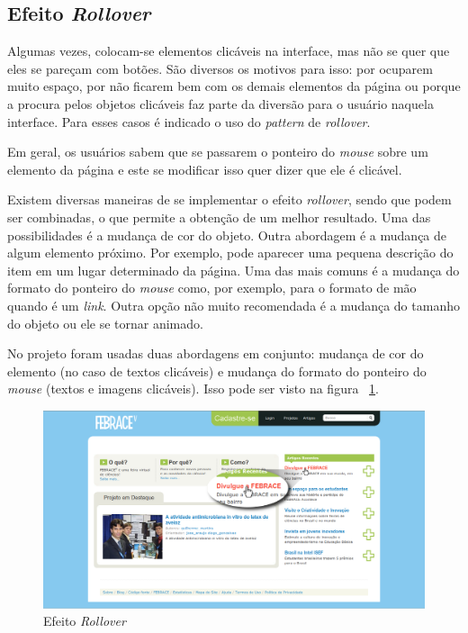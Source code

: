 \subsection{Efeito \textit{Rollover}}

Algumas vezes, colocam-se elementos clicáveis na interface, mas não se quer que eles se pareçam com botões. São diversos os motivos para isso: por ocuparem muito espaço, por não ficarem bem com os demais elementos da página ou porque a procura pelos objetos clicáveis faz parte da diversão para o usuário naquela interface. Para esses casos é indicado o uso do \textit{pattern} de \textit{rollover}.

Em geral, os usuários sabem que se passarem o ponteiro do \textit{mouse} sobre um elemento da página e este se modificar isso quer dizer que ele é clicável.

Existem diversas maneiras de se implementar o efeito \textit{rollover}, sendo que podem ser combinadas, o que permite a obtenção de um melhor resultado. Uma das possibilidades é a mudança de cor do objeto. Outra abordagem é a mudança de algum elemento próximo. Por exemplo, pode aparecer uma pequena descrição do item em um lugar determinado da página. Uma das mais comuns é a mudança do formato do ponteiro do \textit{mouse} como, por exemplo, para o formato de mão quando é um \textit{link}. Outra opção não muito recomendada é a mudança do tamanho do objeto ou ele se tornar animado.

No projeto foram usadas duas abordagens em conjunto: mudança de cor do elemento (no caso de textos clicáveis) e mudança do formato do ponteiro do \textit{mouse} (textos e imagens clicáveis). Isso pode ser visto na figura ~\ref{rollover_effect}.

    \begin{figure}[h]
        \begin{center}
    \includegraphics[width=1.0\linewidth]{arquivos/rollover_effect.png}
        \end{center}
        \caption{Efeito \textit{Rollover}}
        \label{rollover_effect}
    \end{figure}

